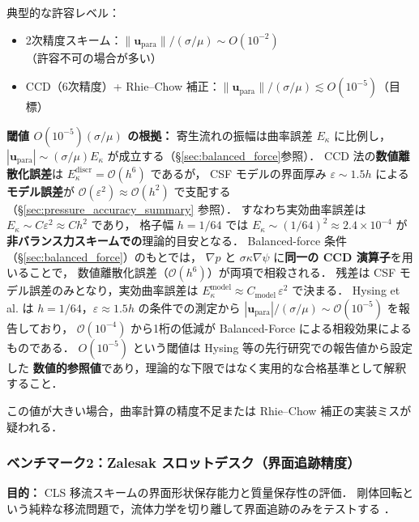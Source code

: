 \begin{tcolorbox}[mybox, title={寄生流れ振幅の目安と閾値の根拠}]
典型的な許容レベル：
\begin{itemize}
  \item 2次精度スキーム：$\|\bm{u}_{\text{para}}\| / ({\sigma/\mu}) \sim O(10^{-2})$（許容不可の場合が多い）
  \item CCD（6次精度）+ Rhie--Chow 補正：$\|\bm{u}_{\text{para}}\| / ({\sigma/\mu}) \lesssim O(10^{-5})$（目標）
\end{itemize}

\textbf{閾値 $O(10^{-5})(\sigma/\mu)$ の根拠：}
寄生流れの振幅は曲率誤差 $E_\kappa$ に比例し，$|\bm{u}_\text{para}| \sim (\sigma/\mu) E_\kappa$ が成立する（§\ref{sec:balanced_force}参照）．
CCD 法の\textbf{数値離散化誤差}は $E_\kappa^{\text{discr}} = \mathcal{O}(h^6)$ であるが，
CSF モデルの界面厚み $\varepsilon \sim 1.5h$ による\textbf{モデル誤差}が $\mathcal{O}(\varepsilon^2)\approx\mathcal{O}(h^2)$ で支配する
（§\ref{sec:pressure_accuracy_summary} 参照）．
すなわち実効曲率誤差は $E_\kappa \sim C\varepsilon^2 \approx C h^2$ であり，
格子幅 $h = 1/64$ では $E_\kappa \sim (1/64)^2 \approx 2.4\times10^{-4}$ が\textbf{非バランス力スキームでの}理論的目安となる．
Balanced-force 条件（§\ref{sec:balanced_force}）のもとでは，
$\nabla p$ と $\sigma\kappa\nabla\psi$ に\textbf{同一の CCD 演算子}を用いることで，
数値離散化誤差（$\mathcal{O}(h^6)$）が両項で相殺される．
残差は CSF モデル誤差のみとなり，実効曲率誤差は $E_\kappa^{\text{model}} \approx C_{\text{model}}\,\varepsilon^2$ で決まる．
Hysing et al. \cite{Hysing2009} は $h = 1/64$，$\varepsilon \approx 1.5h$ の条件での測定から
$|\bm{u}_\text{para}|/(\sigma/\mu) \sim \mathcal{O}(10^{-5})$ を報告しており，
$\mathcal{O}(10^{-4})$ から1桁の低減が Balanced-Force による相殺効果によるものである．
$O(10^{-5})$ という閾値は Hysing 等の先行研究での報告値から設定した
\textbf{数値的参照値}であり，理論的な下限ではなく実用的な合格基準として解釈すること．

この値が大きい場合，曲率計算の精度不足または Rhie--Chow 補正の実装ミスが疑われる．
\end{tcolorbox}

\subsubsection{ベンチマーク2：Zalesak スロットデスク（界面追跡精度）}
\label{sec:bench_zalesak}

\textbf{目的：} CLS 移流スキームの界面形状保存能力と質量保存性の評価．
剛体回転という純粋な移流問題で，流体力学を切り離して界面追跡のみをテストする \cite{Zalesak1979}．

